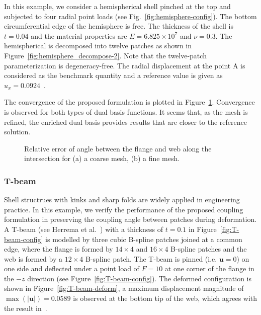 In this example, we consider a hemispherical shell pinched at the top and subjected to four radial point loads (see Fig.~\ref{fig:hemisphere-config}). The bottom circumferential edge of the hemisphere is free. The thickness of the shell is $t = 0.04$ and the material properties are $E = 6.825\times{}10^7$ and $\nu = 0.3$. The hemispherical is decomposed into twelve patches as shown in Figure~\ref{fig:hemisphere_decompose-2}. Note that the twelve-patch parameterization is degeneracy-free. The radial displacement at the point A is considered as the benchmark quantity and a reference value is given as $u_x = 0.0924$~\cite{kiendl2009isogeometric}.\par

The convergence of the proposed formulation is plotted in Figure~\ref{fig:hemisphere_result}. Convergence is observed for both types of dual basis functions. It seems that, as the mesh is refined, the enriched \Bezier dual basis provides results that are closer to the reference solution.  
\begin{figure}[h]
	\center
	
	\caption{Relative error of angle between the flange and web along the intersection for (a) a coarse mesh, (b) a fine mesh. }
	\label{fig:hemisphere_result}
\end{figure}
\FloatBarrier
\subsubsection{T-beam}

Shell structrues with kinks and sharp folds are widely applied in engineering practice. In this example, we verify the performance of the proposed coupling formulation in preserving the coupling angle between patches during deformation. A T-beam (see Herrema et al.~\cite{herrema2019penalty}) with a thickness of $t=0.1$ in Figure~\ref{fig:T-beam-config} is modelled by three cubic B-spline patches joined at a common edge, where the flange is formed by $14\times 4$ and $ 16\times 4$ B-spline patches and the web is formed by a $12\times 4$ B-spline patch. The T-beam is pinned (i.e. $\mathbf{u}=0$) on one side and deflected under a point load of $F = 10$ at one corner of the flange in the $-z$ direction (see Figure~\ref{fig:T-beam-config}). The deformed configuration is shown in Figure~\ref{fig:T-beam-deform}, a maximum displacement magnitude of $\max(\vert \mathbf{u} \vert)=0.0589$ is observed at the bottom tip of the web, which agrees with the result in~\cite{herrema2019penalty}. \par

